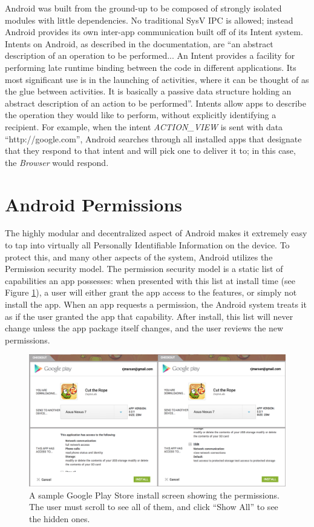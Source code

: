 Android was built from the ground-up to be composed of strongly isolated modules with little dependencies. No traditional SysV IPC is allowed; instead Android provides its own inter-app communication built off of its Intent system. Intents on Android, as described in the documentation, are ``an abstract description of an operation to be performed... An Intent provides a facility for performing late runtime binding between the code in different applications. Its most significant use is in the launching of activities, where it can be thought of as the glue between activities. It is basically a passive data structure holding an abstract description of an action to be performed''\citep{androidintents}. Intents allow apps to describe the operation they would like to perform, without explicitly identifying a recipient. For example, when the intent \textit{ACTION\_VIEW} is sent with data ``http://google.com'', Android searches through all installed apps that designate that they respond to that intent and will pick one to deliver it to; in this case, the \textit{Browser} would respond.

\section{Android Permissions}
The highly modular and decentralized aspect of Android makes it extremely easy to tap into virtually all Personally Identifiable Information on the device. To protect this, and many other aspects of the system, Android utilizes the Permission security model. The permission security model is a static list of capabilities an app possesses: when presented with this list at install time (see Figure \ref{fig:gpstorepermissions}), a user will either grant the app access to the features, or simply not install the app. When an app requests a permission, the Android system treats it as if the user granted the app that capability. After install, this list will never change unless the app package itself changes, and the user reviews the new permissions.

\begin{figure}[h]
\begin{center}
\includegraphics[width=1.0\columnwidth]{figs/GPStoreInstallScreen}
\caption{A sample Google Play Store install screen showing the permissions. The user must scroll to see all of them, and click ``Show All'' to see the hidden ones.}
\label{fig:gpstorepermissions}
\end{center}
\end{figure}

